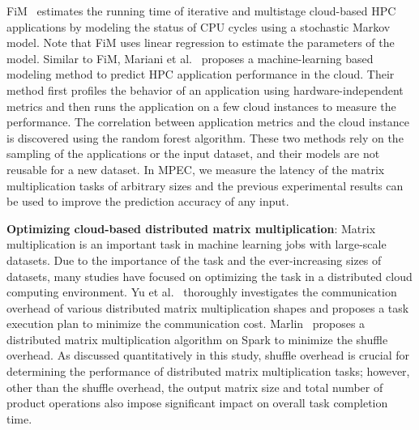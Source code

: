 \documentclass[10pt, conference, compsocconf]{IEEEtran}
\begin{document}
FiM~\cite{fim} estimates the running time of iterative and multistage cloud-based HPC applications by modeling the status of CPU cycles using a stochastic Markov model. Note that FiM uses linear regression to estimate the parameters of the model. Similar to FiM, Mariani et al.~\cite{hpc-cloud-predict} proposes a machine-learning based modeling method to predict HPC application performance in the cloud. Their method first profiles the behavior of an application using hardware-independent metrics and then runs the application on a few cloud instances to measure the performance. The correlation between application metrics and the cloud instance is discovered using the random forest algorithm. These two methods rely on the sampling of the applications or the input dataset, and their models are not reusable for a new dataset. In MPEC, we measure the latency of the matrix multiplication tasks of arbitrary sizes and the previous experimental results can be used to improve the prediction accuracy of any input.

\textbf{Optimizing cloud-based distributed matrix multiplication}: Matrix multiplication is an important task in machine learning jobs with large-scale datasets. Due to the importance of the task and the ever-increasing sizes of datasets, many studies have focused on optimizing the task in a distributed cloud computing environment. Yu et al.~\cite{matmult-overhead-profiling} thoroughly investigates the communication overhead of various distributed matrix multiplication shapes and proposes a task execution plan to minimize the communication cost. Marlin~\cite{marlin} proposes a distributed matrix multiplication algorithm on Spark to minimize the shuffle overhead. As discussed quantitatively in this study, shuffle overhead is crucial for determining the performance of distributed matrix multiplication tasks; however, other than the shuffle overhead, the output matrix size and total number of product operations also impose significant impact on overall task completion time.
\end{document}
